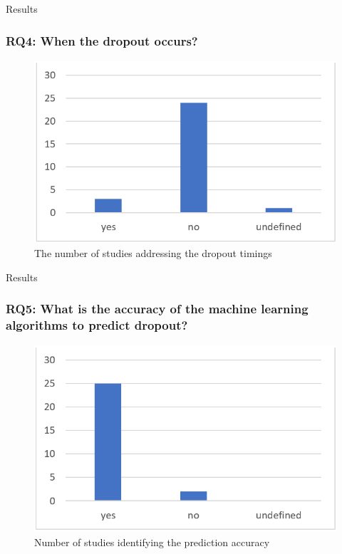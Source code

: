 \documentclass[10pt]{beamer}
\begin{document}
\begin{frame}[fragile]{Results}
	\frametitle{RQ4: When the dropout occurs?}
	\begin{figure}
		\includegraphics[scale=0.5]{../img/dropoutTimings.png}
		\caption{The number of studies addressing the dropout timings}
		\label{figure4}
	\end{figure}
\end{frame}

\begin{frame}[fragile]{Results}
	\frametitle{RQ5: What is the accuracy of the machine learning algorithms to predict dropout?}
	\begin{figure}
		\includegraphics[scale=0.5]{../img/predictionAccuracy.png}
		\caption{Number of studies identifying the prediction accuracy}
		\label{figure3}
	\end{figure}
\end{frame}
\end{document}

